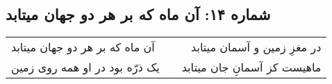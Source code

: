 \begin{center}
\section*{شماره ۱۴: آن ماه که بر هر دو جهان میتابد}
\label{sec:014}
\begin{longtable}{l p{0.5cm} r}
آن ماه که بر هر دو جهان میتابد
&&
در مغزِ زمین و آسمان میتابد
\\
یک ذرّه بود در او همه روی زمین
&&
ماهیست کز آسمانِ جان میتابد
\\
\end{longtable}
\end{center}
